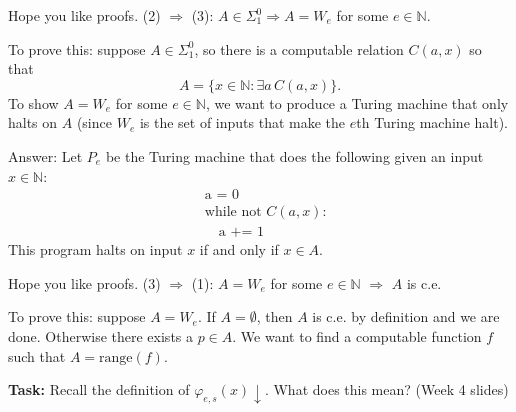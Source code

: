 \documentclass{beamer}
\begin{document}
\begin{frame}{Hope you like proofs.}
(2) $\Rightarrow$ (3): $A \in \Sigma^0_1 \Rightarrow A = W_e$ for some $e \in \mathbb N$.

\vspace{2mm}

To prove this: suppose $A \in \Sigma^0_1$, so there is a computable relation $C(a, x)$ so that
$$A = \{x \in \mathbb N: \exists a \, C(a, x)\}.$$
To show $A = W_e$ for some $e \in \mathbb N$, we want to produce a Turing machine that only halts on $A$ (since $W_e$ is the set of inputs that make the $e$th Turing machine halt).

\vspace{2mm}

Answer: Let $P_e$ be the Turing machine that does the following given an input $x \in \mathbb N$:
\begin{align*}
& \text{a = 0}\\
& \text{while not $C(a, x)$:}\\
& \quad \text{a += 1}
\end{align*}
This program halts on input $x$ if and only if $x \in A$.
\end{frame}

\begin{frame}{Hope you like proofs.}
(3) $\Rightarrow$ (1): $A = W_e$ for some $e \in \mathbb N$ $\Rightarrow$ $A$ is c.e.

\vspace{2mm}

To prove this: suppose $A = W_e$. If $A = \emptyset$, then $A$ is c.e. by definition and we are done. Otherwise there exists a $p \in A$. We want to find a computable function $f$ such that $A = \text{range}(f)$.

\vspace{2mm}

\textbf{Task:} Recall the definition of $\varphi_{e, s}(x) \downarrow$. What does this mean? (Week 4 slides)
\end{frame}
\end{document}
